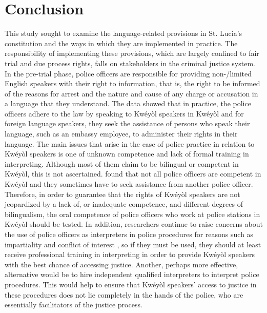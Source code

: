 \documentclass[output=paper,colorlinks,citecolor=brown]{langscibook}
\begin{document}
\section{Conclusion}
\largerpage
This study sought to examine the language-related provisions in St. Lucia’s constitution and the ways in which they are implemented in practice. The responsibility of implementing these provisions, which are largely confined to fair trial and due process rights, falls on stakeholders in the criminal justice system. In the pre-trial phase, police officers are responsible for providing non-/limited English speakers with their right to information, that is, the right to be informed of the reasons for arrest and the nature and cause of any charge or accusation in a language that they understand. The data showed that in practice, the police officers adhere to the law by speaking to Kwéyòl speakers in Kwéyòl and for foreign language speakers, they seek the assistance of persons who speak their language, such as an embassy employee, to administer their rights in their language. The main issues that arise in the case of police practice in relation to Kwéyòl speakers is one of unknown competence and lack of formal training in interpreting. Although most of them claim to be bilingual or competent in Kwéyòl, this is not ascertained. \citet{Evans2019} found that not all police officers are competent in Kwéyòl and they sometimes have to seek assistance from another police officer. Therefore, in order to guarantee that the rights of Kwéyòl speakers are not jeopardized by a lack of, or inadequate competence, and different degrees of bilingualism, the oral competence of police officers who work at police stations in Kwéyòl should be tested. In addition, researchers continue to raise concerns about the use of police officers as interpreters in police procedures for reasons such as impartiality and conflict of interest \citep{BerkSeligson2000}, so if they must be used, they should at least receive professional training in interpreting in order to provide Kwéyòl speakers with the best chance of accessing justice. Another, perhaps more effective, alternative would be to hire independent qualified interpreters to interpret police procedures. This would help to ensure that Kwéyòl speakers’ access to justice in these procedures does not lie completely in the hands of the police, who are essentially facilitators of the justice process.
\end{document}
